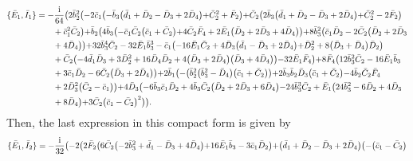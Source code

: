 \documentclass[10pt]{amsart}
\theoremstyle{definition}
\theoremstyle{corollary}
\theoremstyle{remark}
\theoremstyle{conclusion}
\begin{document}
 \begin{align}
	\{\bar{E}_1, \bar{I}_1\}&=-\frac{\rm i}{64}  \bigl(2 \bar{b}_2^2 \bigl(-2 \bar{c}_1 \bigl(-\bar{b}_3 \bigl(\bar{d}_1+\bar{D}_2-\bar{D}_3+2 \bar{D}_4\bigl)+\bar{C}_2^2+\bar{F}_2\bigl)+\bar{C}_2 \bigl(2 \bar{b}_3 \bigl(\bar{d}_1+\bar{D}_2-\bar{D}_3+2 \bar{D}_4\bigl)+\bar{C}_2^2-2 \bar{F}_2\bigl) \nonumber\\
	& \hskip 0.7cm +\bar{c}_1^2 \bar{C}_2\bigl)+\bar{b}_2 \bigl(4 \bar{b}_3 \bigl(-\bar{c}_1 \bar{C}_2 \bigl(\bar{c}_1+\bar{C}_2\bigl)+4 \bar{C}_2 \bar{F}_4+2 \bar{E}_1 \bigl(\bar{D}_2+2 \bar{D}_3+4 \bar{D}_4\bigl)\bigl)+8 \bar{b}_3^2 \bigl(\bar{c}_1 \bar{D}_2-2 \bar{C}_2 \bigl(\bar{D}_2+2 \bar{D}_3 \nonumber\\
	& \hskip 0.7cm +4 \bar{D}_4\bigl)\bigl)+32 \bar{b}_3^4 \bar{C}_2-32 \bar{E}_1 \bar{b}_3^3-\bar{c}_1 \bigl(-16 \bar{E}_1 \bar{C}_2+4 \bar{D}_3 \bigl(\bar{d}_1-\bar{D}_3+2 \bar{D}_4\bigl)+\bar{D}_2^2+8 \bigl(\bar{D}_3+\bar{D}_4\bigl) \bar{D}_2\bigl) \nonumber\\
	& \hskip 0.7cm +\bar{C}_2 \bigl(-4 \bar{d}_1 \bar{D}_3+3 \bar{D}_2^2+16 \bar{D}_4 \bar{D}_2+4 \bigl(\bar{D}_3+2 \bar{D}_4\bigl) \bigl(\bar{D}_3+4 \bar{D}_4\bigl)\bigl)-32 \bar{E}_1 \bar{F}_4\bigl)+8 \bar{F}_4 \bigl(12 \bar{b}_3^2 \bar{C}_2-16 \bar{E}_1 \bar{b}_3  \nonumber\\
	& \hskip 0.7cm+3 \bar{c}_1 \bar{D}_2-6 \bar{C}_2 \bigl(\bar{D}_3+2 \bar{D}_4\bigl)\bigl)+2 \bar{b}_1 \bigl(-\bigl(\bar{b}_2^2 \bigl(\bar{b}_3^2-\bar{D}_4\bigl) \bigl(\bar{c}_1+\bar{C}_2\bigl)\bigl)+2 \bar{b}_3 \bar{b}_2 \bar{D}_3 \bigl(\bar{c}_1+\bar{C}_2\bigl)-4 \bar{b}_2 \bar{C}_2 \bar{F}_4 \nonumber\\
	& \hskip 0.7cm+2 \bar{D}_3^2 \bigl(\bar{C}_2-\bar{c}_1\bigl)\bigl)+4 \bar{D}_3 \bigl(-6 \bar{b}_3 \bar{c}_1 \bar{D}_2+4 \bar{b}_3 \bar{C}_2 \bigl(\bar{D}_2+2 \bar{D}_3+6 \bar{D}_4\bigl)-24 \bar{b}_3^3 \bar{C}_2+\bar{E}_1 \bigl(24 \bar{b}_3^2-6 \bar{D}_2+4 \bar{D}_3 \nonumber\\
	& \hskip 0.7cm+8 \bar{D}_4\bigl)+3 \bar{C}_2 \bigl(\bar{c}_1-\bar{C}_2\bigl)^2\bigl)\bigl) . 
 \end{align} Then, the last expression in this compact form is given by \begin{align}
		\{\bar{E}_1, \bar{I}_2\}&=-\frac{\rm i}{32}  \bigl(-2 \bigl(2 \bar{F}_2 \bigl(6 \bar{C}_2 \bigl(-2 \bar{b}_3^2+\bar{d}_1-\bar{D}_3+4 \bar{D}_4\bigl)+16 \bar{E}_1 \bar{b}_3-3 \bar{c}_1 \bar{D}_2\bigl)+\bigl(\bar{d}_1+\bar{D}_2-\bar{D}_3+2 \bar{D}_4\bigl) \bigl(-\bigl(\bar{c}_1-\bar{C}_2\bigl) \nonumber\\

\end{align}
\end{document}
